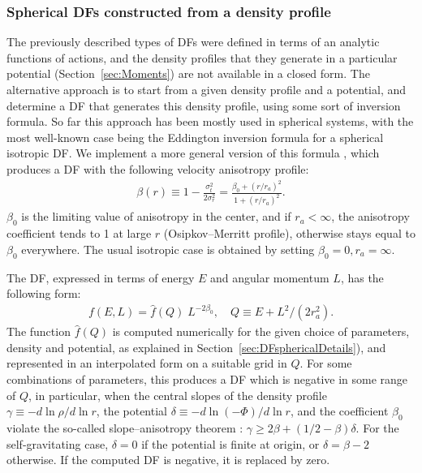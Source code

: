 \documentclass[12pt]{article}
\begin{document}
%


\subsubsection{Spherical DFs constructed from a density profile}  \label{sec:DFspherical}

The previously described types of DFs were defined in terms of an analytic functions of actions, and the density profiles that they generate in a particular potential (Section~\ref{sec:Moments}) are not available in a closed form. The alternative approach is to start from a given density profile and a potential, and determine a DF that generates this density profile, using some sort of inversion formula. So far this approach has been mostly used in spherical systems, with the most well-known case being the Eddington inversion formula for a spherical isotropic DF. We implement a more general version of this formula \cite{Cuddeford1991}, which produces a DF with the following velocity anisotropy profile:
\begin{align*}
\beta(r) \equiv 1 - \frac{\sigma_t^2}{2\sigma_r^2} = \frac{\beta_0 + (r/r_a)^2}{1 + (r/r_a)^2}.
\end{align*}
$\beta_0$ is the limiting value of anisotropy in the center, and if $r_a<\infty$, the anisotropy coefficient tends to 1 at large $r$ (Osipkov--Merritt profile), otherwise stays equal to $\beta_0$ everywhere. The usual isotropic case is obtained by setting $\beta_0=0, r_a=\infty$.

The DF, expressed in terms of energy $E$ and angular momentum $L$, has the following form:
\begin{align*}
f(E,L) = \hat f(Q) \; L^{-2\beta_0}, \quad Q\equiv E + L^2 / (2 r_a^2) .
\end{align*}
The function $\hat f(Q)$ is computed numerically for the given choice of parameters, density and potential, as explained in Section~\ref{sec:DFsphericalDetails}), and represented in an interpolated form on a suitable grid in $Q$.
For some combinations of parameters, this produces a DF which is negative in some range of $Q$, in particular, when the central slopes of the density profile $\gamma \equiv -d\ln\rho/d\ln r$, the potential $\delta \equiv -d\ln(-\Phi)/d\ln r$, and the coefficient $\beta_0$ violate the so-called slope--anisotropy theorem \cite{AnEvans2006}: $\gamma \ge 2\beta + (1/2-\beta)\delta$. For the self-gravitating case, $\delta=0$ if the potential is finite at origin, or $\delta=\beta-2$ otherwise. If the computed DF is negative, it is replaced by zero.
\end{document}
